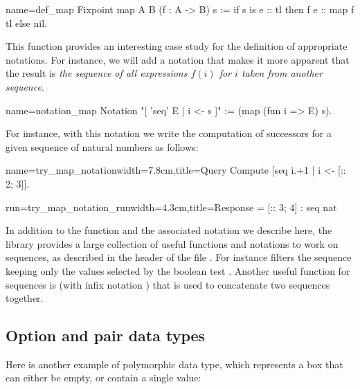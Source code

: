 \begin{coq}{name=def_map}{}
Fixpoint map A B (f : A -> B) s :=
  if s is e :: tl then f e :: map f tl else nil.
\end{coq}
This function provides an interesting case study for the definition of
appropriate notations. For instance, we will add a notation that
makes it more apparent that the result is {\em the sequence of all
expressions \(f(i)\) for \(i\) taken from another sequence}.

\begin{coq}{name=notation_map}{}
Notation "[ 'seq' E | i <- s ]" := (map (fun i => E) s).
\end{coq}
For instance, with this notation we write the computation of successors
for a given sequence of natural numbers as follows:

\begin{coq-left}{name=try_map_notation}{width=7.8cm,title=Query}
Compute
  [seq i.+1 | i <- [:: 2; 3]].
\end{coq-left}
\begin{coqout-right}{run=try_map_notation_run}{width=4.3cm,title=Response}
= [:: 3; 4] : seq nat
$~$
\end{coqout-right}
\index[coq]{\C{[seq .. "| .. <- ..]}}
In addition to the function  and the associated notation
we describe here, the \mcbMC{} library
provides a large collection of useful functions and notations to work on
sequences, as described in the header of the file .  For
instance \C{[seq i <- s | p]} filters the sequence  keeping only
the values selected by the boolean test .
Another useful function for sequences is  (with infix notation \C{++})
that is used to concatenate two sequences together.
\index[coq]{\C{(_ ++ _)}}
\index[coq]{\C{[seq .. <- .. "| ..]}}

\subsection{Option and pair data types}\label{sec:othercontainers}

Here is another example of polymorphic data type, which represents a
box that can either be empty, or contain a single value:


